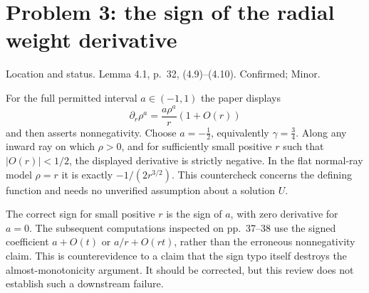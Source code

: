 \documentclass[10pt]{article}
\begin{document}
\section*{Problem 3: the sign of the radial weight derivative}
Location and status. Lemma 4.1, p. 32, (4.9)–(4.10). Confirmed; Minor.\par
For the full permitted interval \(a\in(-1,1)\) the paper displays \[\partial_r\rho^a=\frac{a\rho^a}{r}(1+O(r))\] and then asserts nonnegativity. Choose \(a=-\tfrac12\), equivalently \(\gamma=\tfrac34\). Along any inward ray on which \(\rho>0\), and for sufficiently small positive \(r\) such that \(|O(r)|<1/2\), the displayed derivative is strictly negative. In the flat normal-ray model \(\rho=r\) it is exactly \(-1/(2r^{3/2})\). This countercheck concerns the defining function and needs no unverified assumption about a solution \(U\).\par
The correct sign for small positive \(r\) is the sign of \(a\), with zero derivative for \(a=0\). The subsequent computations inspected on pp. 37–38 use the signed coefficient \(a+O(t)\) or \(a/r+O(rt)\), rather than the erroneous nonnegativity claim. This is counterevidence to a claim that the sign typo itself destroys the almost-monotonicity argument. It should be corrected, but this review does not establish such a downstream failure.\par
\end{document}
